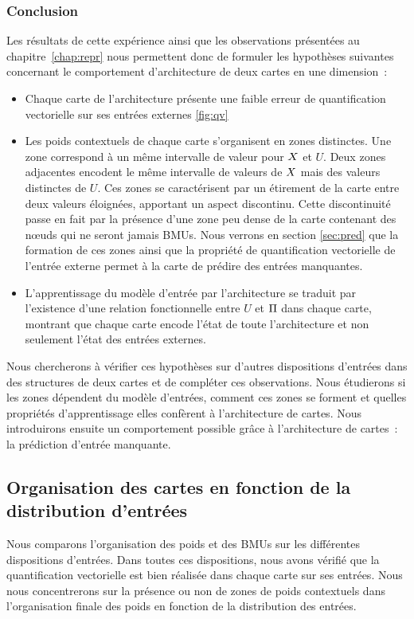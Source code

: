 \documentclass[../main]{subfiles}
\begin{document}
\subsubsection{Conclusion}

Les résultats de cette expérience ainsi que les observations présentées au chapitre~\ref{chap:repr} nous permettent donc de formuler les hypothèses suivantes concernant le comportement d'architecture de deux cartes en une dimension~:

\begin{itemize}
	\item Chaque carte de l'architecture présente une faible erreur de quantification vectorielle sur ses entrées externes \ref{fig:qv}
	\item Les poids contextuels de chaque carte s'organisent en zones distinctes. Une zone correspond à un même intervalle de valeur pour $X$ et $U$. Deux zones adjacentes encodent le même intervalle de valeurs de $X$ mais des valeurs distinctes de $U$. Ces zones se caractérisent par un étirement de la carte entre deux valeurs éloignées, apportant un aspect discontinu. Cette discontinuité passe en fait par la présence d'une zone peu dense de la carte contenant des n\oe{}uds qui ne seront jamais BMUs. Nous verrons en section \ref{sec:pred} que la formation de ces zones ainsi que la propriété de quantification vectorielle de l'entrée externe permet à la carte de prédire des entrées manquantes.
	\item L'apprentissage du modèle d'entrée par l'architecture se traduit par l'existence d'une relation fonctionnelle entre $U$ et $\Pi$ dans chaque carte, montrant que chaque carte encode l'état de toute l'architecture et non seulement l'état des entrées externes.
\end{itemize}

Nous chercherons à vérifier ces hypothèses sur d'autres dispositions d'entrées dans des structures de deux cartes et de compléter ces observations.
Nous étudierons si les zones dépendent du modèle d'entrées, comment ces zones se forment et quelles propriétés d'apprentissage elles confèrent à l'architecture de cartes.
Nous introduirons ensuite un comportement possible grâce à l'architecture de cartes~: la prédiction d'entrée manquante.

\subsection{Organisation des cartes en fonction de la distribution d'entrées}
Nous comparons l'organisation des poids et des BMUs sur les différentes dispositions d'entrées.
Dans toutes ces dispositions, nous avons vérifié que la quantification vectorielle est bien réalisée dans chaque carte sur ses entrées. Nous nous concentrerons sur la présence ou non de zones de poids contextuels dans l'organisation finale des poids en fonction de la distribution des entrées.
\end{document}
